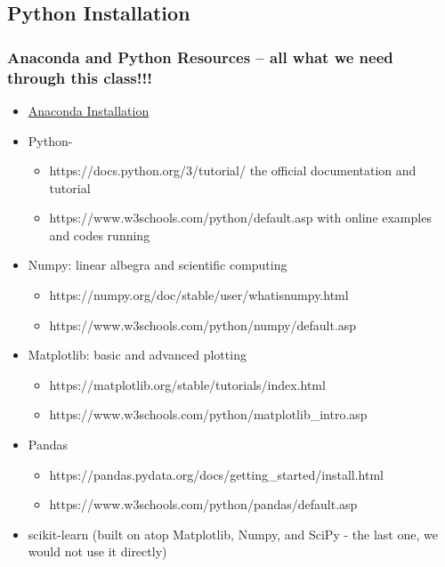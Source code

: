 \documentclass[11pt]{article}
\providecommand{\tightlist}{%
      \setlength{\itemsep}{0pt}\setlength{\parskip}{0pt}}
\begin{document}
    \hypertarget{python-installation}{%
\subsection{Python Installation}\label{python-installation}}

    \hypertarget{anaconda-and-python-resources-all-what-we-need-through-this-class}{%
\subsubsection{Anaconda and Python Resources -- all what we need through
this
class!!!}\label{anaconda-and-python-resources-all-what-we-need-through-this-class}}

    \begin{itemize}
\item
  \href{https://docs.anaconda.com/anaconda/install/index.html}{Anaconda
  Installation}
\item
  Python-

  \begin{itemize}
  \tightlist
  \item
    https://docs.python.org/3/tutorial/ the official documentation and
    tutorial
  \item
    https://www.w3schools.com/python/default.asp with online examples
    and codes running
  \end{itemize}
\item
  Numpy: linear albegra and scientific computing

  \begin{itemize}
  \tightlist
  \item
    https://numpy.org/doc/stable/user/whatisnumpy.html
  \item
    https://www.w3schools.com/python/numpy/default.asp
  \end{itemize}
\item
  Matplotlib: basic and advanced plotting

  \begin{itemize}
  \tightlist
  \item
    https://matplotlib.org/stable/tutorials/index.html
  \item
    https://www.w3schools.com/python/matplotlib\_intro.asp
  \end{itemize}
\item
  Pandas

  \begin{itemize}
  \tightlist
  \item
    https://pandas.pydata.org/docs/getting\_started/install.html
  \item
    https://www.w3schools.com/python/pandas/default.asp
  \end{itemize}
\item
  scikit-learn (built on atop Matplotlib, Numpy, and SciPy - the last
  one, we would not use it directly)


\end{itemize}
\end{document}
